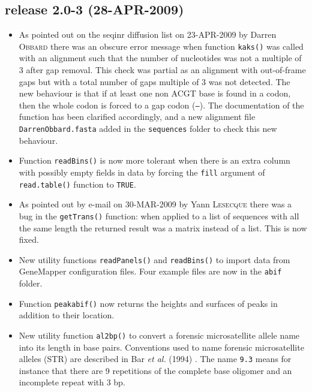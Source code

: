 \documentclass{article}
\begin{document}
\subsection*{release 2.0-3 (28-APR-2009)}

\begin{itemize}

\item As pointed out on the seqinr diffusion list on 23-APR-2009
by Darren \textsc{Obbard} there was an obscure error message when function
\texttt{kaks()} was called with an alignment such that the number
of nucleotides was not a multiple of 3 after gap removal. This check
was partial as an alignment with out-of-frame gaps but with
a total number of gaps multiple of 3 was not detected.
The new behaviour is that if at least one non ACGT base is found in a
codon, then the whole codon is forced to a gap codon (\texttt{---}).
The documentation of the function has been clarified accordingly,
and a new alignment file \texttt{DarrenObbard.fasta} added in
the \texttt{sequences} folder to check this new behaviour.

\item Function \texttt{readBins()} is now more tolerant when there
is an extra column with possibly empty fields in data by forcing
the \texttt{fill} argument of \texttt{read.table()} function to
\texttt{TRUE}.

\item As pointed out by e-mail on 30-MAR-2009 by Yann \textsc{Lesecque} there
was a bug in the \texttt{getTrans()} function: when applied to a
list of sequences with all the same length the returned result
was a matrix instead of a list. This is now fixed.

\item New utility functions \texttt{readPanels()} and \texttt{readBins()}
to import data from GeneMapper configuration files. Four example files
are now in the \texttt{abif} folder.

\item Function \texttt{peakabif()} now returns the heights and
surfaces of peaks in addition to their location.

\item New utility function \texttt{al2bp()} to convert
a forensic microsatellite allele name into its length in base pairs.
Conventions used to name forensic microsatellite alleles (STR) are described
in Bar \emph{et al.} (1994) \cite{BarW1994}.
The name \texttt{9.3} means for instance that there are
9 repetitions of the complete base oligomer and an incomplete
repeat with 3 bp.

\end{itemize}
\end{document}
